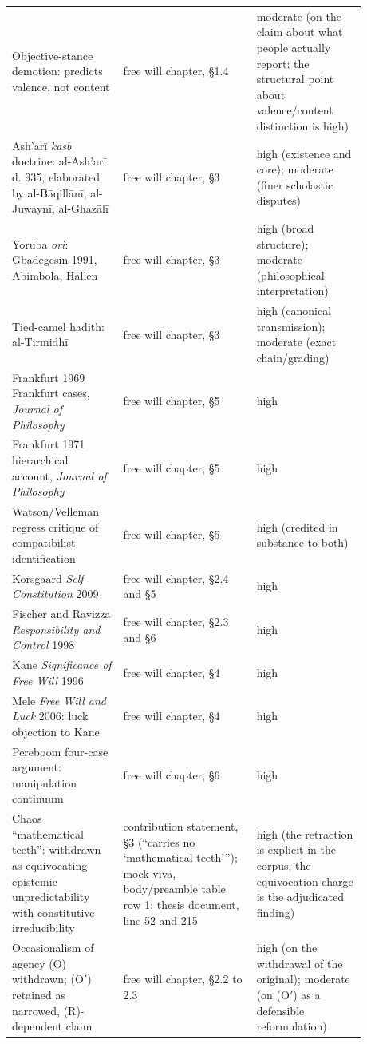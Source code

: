 \documentclass[11pt]{article}
\begin{document}
{\begin{longtable}{>{\raggedright\arraybackslash}p{0.269\linewidth}>{\raggedright\arraybackslash}p{0.333\linewidth}>{\raggedright\arraybackslash}p{0.278\linewidth}}
Objective-stance demotion: predicts valence, not content & free will chapter, §1.4 & moderate (on the claim about what people actually report; the structural point about valence/\allowbreak{}content distinction is high) \\
Ash'arī \emph{kasb} doctrine: al-Ash'arī d. 935, elaborated by al-Bāqillānī, al-Juwaynī, al-Ghazālī & free will chapter, §3 & high (existence and core); moderate (finer scholastic disputes) \\
Yoruba \emph{orì}: Gbadegesin 1991, Abimbola, Hallen & free will chapter, §3 & high (broad structure); moderate (philosophical interpretation) \\
Tied-camel hadith: al-Tirmidhī & free will chapter, §3 & high (canonical transmission); moderate (exact chain/\allowbreak{}grading) \\
Frankfurt 1969 Frankfurt cases, \emph{Journal of Philosophy} & free will chapter, §5 & high \\
Frankfurt 1971 hierarchical account, \emph{Journal of Philosophy} & free will chapter, §5 & high \\
Watson/\allowbreak{}Velleman regress critique of compatibilist identification & free will chapter, §5 & high (credited in substance to both) \\
Korsgaard \emph{Self-Constitution} 2009 & free will chapter, §2.4 and §5 & high \\
Fischer and Ravizza \emph{Responsibility and Control} 1998 & free will chapter, §2.3 and §6 & high \\
Kane \emph{Significance of Free Will} 1996 & free will chapter, §4 & high \\
Mele \emph{Free Will and Luck} 2006: luck objection to Kane & free will chapter, §4 & high \\
Pereboom four-case argument: manipulation continuum & free will chapter, §6 & high \\
Chaos ``mathematical teeth'': withdrawn as equivocating epistemic unpredictability with constitutive irreducibility & contribution statement, §3 (``carries no `mathematical teeth'{}''); mock viva, body/\allowbreak{}preamble table row 1; thesis document, line 52 and 215 & high (the retraction is explicit in the corpus; the equivocation charge is the adjudicated finding) \\
Occasionalism of agency (O) withdrawn; (O\ensuremath{'}) retained as narrowed, (R)-dependent claim & free will chapter, §2.2 to 2.3 & high (on the withdrawal of the original); moderate (on (O\ensuremath{'}) as a defensible reformulation) \\

\end{longtable}}
\end{document}
